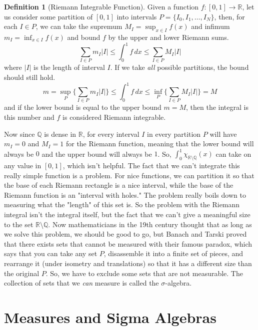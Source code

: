 \documentclass{article}
\theoremstyle{remark}
\theoremstyle{definition}
\newtheorem{definition}{Definition}[section]
\begin{document}
\begin{definition}[Riemann Integrable Function]
Given a function $f: [0, 1] \longrightarrow \mathbb{R}$, let us consider some partition of $[0, 1]$ into intervals $P = \{I_0, I_1, \ldots, I_N\}$, then, for each $I \in P$, we can take the supremum $M_I = \sup_{x \in I} f(x)$ and infimum $m_I = \inf_{x \in I} f(x)$ and bound $f$ by the upper and lower Riemann sums. 
\[\sum_{I \in P} m_I |I| \leq \int_0^1 f \,dx \leq \sum_{I \in P} M_I |I| \]
where $|I|$ is the length of interval $I$. If we take \textit{all} possible partitions, the bound should still hold. 
\[m = \sup_P \Big\{ \sum_{I \in P} m_I |I| \Big\} \leq \int_0^1 f \,dx \leq \inf_P \Big\{ \sum_{I \in P} M_I |I| \Big\} = M\]
and if the lower bound is equal to the upper bound $m = M$, then the integral is this number and $f$ is considered Riemann integrable. 
\end{definition}

Now since $\mathbb{Q}$ is dense in $\mathbb{R}$, for every interval $I$ in every partition $P$ will have $m_I = 0$ and $M_I = 1$ for the Riemann function, meaning that the lower bound will always be $0$ and the upper bound will always be $1$. So, $\int_0^1 \chi_{\mathbb{R} \setminus \mathbb{Q}} (x)$ can take on any value in $[0, 1]$, which isn't helpful. The fact that we can't integrate this really simple function is a problem. For nice functions, we can partition it so that the base of each Riemann rectangle is a nice interval, while the base of the Riemann function is an "interval with holes." The problem really boils down to measuring what the "length" of this set is. So the problem with the Riemann integral isn't the integral itself, but the fact that we can't give a meaningful size to the set $\mathbb{R} \setminus \mathbb{Q}$. Now mathematicians in the 19th century thought that as long as we solve this problem, we should be good to go, but Banach and Tarski proved that there exists sets that cannot be measured with their famous paradox, which says that you can take any set $P$, disassemble it into a finite set of pieces, and rearrange it (under isometry and translations) so that it has a different size than the original $P$. So, we have to exclude some sets that are not measurable. The collection of sets that we \textit{can} measure is called the $\sigma$-algebra. 

\section{Measures and Sigma Algebras}
\end{document}
